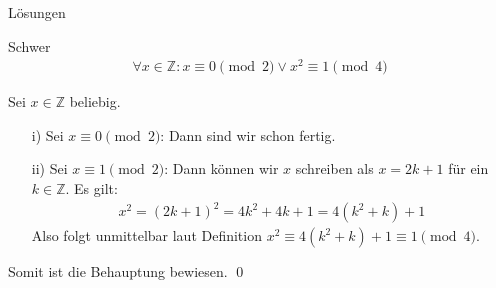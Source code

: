 {
\begin{frame}[fragile]{Lösungen}
    \begin{block}{Schwer}
        \begin{align*}
            \forall x \in \mathbb{Z}: x \equiv 0 \pmod{2} \vee x^2 \equiv 1 \pmod{4}
        \end{align*}
    \end{block}
    Sei $x \in \mathbb{Z}$ beliebig.
    \begin{enumerate}
        \item[i)] Sei $x \equiv 0 \pmod{2}$: Dann sind wir schon fertig.
        \item[ii)] Sei $x \equiv 1 \pmod{2}$: Dann können wir $x$ schreiben als $x = 2k + 1$ für ein $k \in \mathbb{Z}$.
        Es gilt:
        \begin{align*}
            x^2 = (2k+1)^2 = 4k^2 + 4k + 1 = 4(k^2 + k) + 1
        \end{align*}  
        Also folgt unmittelbar laut Definition $x^2 \equiv 4(k^2 + k) + 1 \equiv 1 \pmod{4}$.
    \end{enumerate}
    Somit ist die Behauptung bewiesen. \qed
\end{frame}
}
